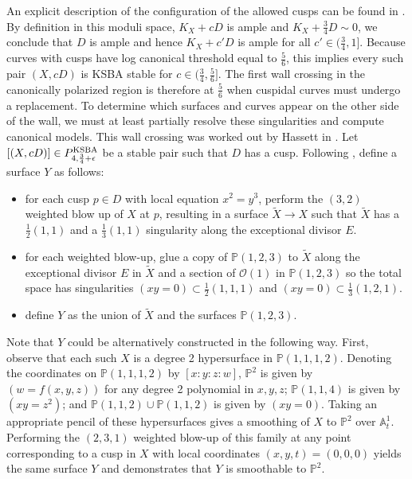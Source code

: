 \documentclass[11pt]{amsart}
\numberwithin{equation}{section}
\theoremstyle{definition}
\newcommand{\KSBA}{{\rm KSBA}}
\newcommand{\bP}{\mathbb{P}}
\newcommand{\bA}{\mathbb{A}}
\newcommand{\calO}{\mathcal{O}}
\begin{document}
An explicit description of the configuration of the allowed cusps can be found in \cite[Lemma 4.2]{hassett}.  By definition in this moduli space, $K_X + cD$ is ample and $K_X + \frac{3}{4} D \sim 0$, we conclude that $D$ is ample and hence $K_X + c'D$ is ample for all $c' \in (\frac{3}{4},1]$.  Because curves with cusps have log canonical threshold equal to $\frac{5}{6}$, this implies every such pair $(X,cD)$ is KSBA stable for $c \in (\frac{3}{4}, \frac{5}{6}]$.  The first wall crossing in the canonically polarized region is therefore at $\frac{5}{6}$ when cuspidal curves must undergo a replacement.  To determine which surfaces and curves appear on the other side of the wall, we must at least partially resolve these singularities and compute canonical models.  This wall crossing was worked out by Hassett in \cite{hassett}.  Let $[(X, cD)] \in P^{\KSBA}_{4, \frac{3}{4}+\epsilon}$ be a stable pair such that $D$ has a cusp.  Following \cite{hassett}, define a surface $Y$ as follows: 
\begin{itemize}
    \item for each cusp $p \in D$ with local equation $x^2  = y^3$, perform the $(3,2)$ weighted blow up of $X$ at $p$, resulting in a surface $\tilde{X} \to X$ such that $\tilde{X}$ has a $\frac{1}{2}(1,1)$ and a $\frac{1}{3}(1,1)$ singularity along the exceptional divisor $E$.
    \item for each weighted blow-up, glue a copy of $\bP(1,2,3)$ to $\tilde{X}$ along the exceptional divisor $E$ in $\tilde{X}$ and a section of $\calO(1)$ in $\bP(1,2,3)$ so the total space has singularities $(xy = 0) \subset \frac{1}{2}(1,1,1)$ and $(xy = 0) \subset \frac{1}{3}(1,2,1)$. 
    \item define $Y$ as the union of $\tilde{X}$ and the surfaces $\bP(1,2,3)$.
\end{itemize}
Note that $Y$ could be alternatively constructed in the following way.  First, observe that each such $X$ is a degree 2 hypersurface in $\bP(1,1,1,2)$.  Denoting the coordinates on $\bP(1,1,1,2)$ by $[x:y:z:w]$, $\bP^2 $ is given by $ (w = f(x,y,z))$ for any degree 2 polynomial in $x,y,z$; $\bP(1,1,4) $ is given by $ (xy = z^2)$; and $\bP(1,1,2) \cup \bP(1,1,2) $ is given by $ (xy = 0)$. Taking an appropriate pencil of these hypersurfaces gives a smoothing of $X$ to $\bP^2$ over $\bA^1_t$.  Performing the $(2,3,1)$ weighted blow-up of this family at any point corresponding to a cusp in $X$ with local coordinates $(x,y,t) = (0,0,0)$ yields the same surface $Y$ and demonstrates that $Y$ is smoothable to $\bP^2$. 
\end{document}
